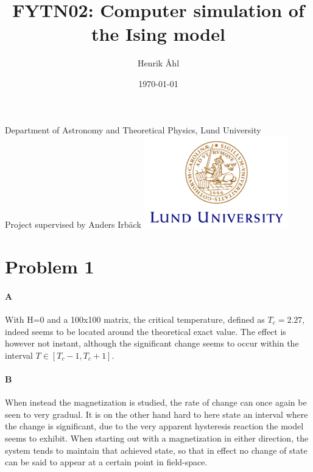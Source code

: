 \documentclass[a4paper,12pt]{article}
\title
{
	\textbf
	{
      FYTN02: Computer simulation of the Ising model
   }
}
\author{Henrik Åhl\\}
\date{\today}
\theoremstyle{plain}
\theoremstyle{definition}
\begin{document}
\begin{titlepage}
	
   \maketitle 
	\begin{center}
		\phantom{a}
		{Department of Astronomy and Theoretical Physics, Lund University}
		\\[2cm]
		{Project supervised by Anders Irbäck}
		\vfill
		\includegraphics[height=4cm]{logocLUeng.pdf}
	\end{center}
	\thispagestyle{empty} %

\end{titlepage}

	\setcounter{equation}{0}
   \section{Problem 1}
    
   \paragraph{A}
      With H=0 and a 100x100 matrix, the critical temperature, defined as
      $T_c = 2.27$, indeed seems to be
      located around the theoretical exact value. The effect is however not
      instant, although the significant change seems to occur within the
      interval $T \in [T_c - 1, T_c+ 1]$.
   \paragraph{B}
      When instead the magnetization is studied, the rate of change can once
      again be seen to very gradual. It is on the other hand hard to here state
      an interval where the change is significant, due to the very apparent
      hysteresis reaction the model seems to exhibit. When starting out with a
      magnetization in either direction, the system tends to maintain that
      achieved state, so that in effect no change of state can be said to appear
      at a certain point in field-space. 
     
\end{document}
